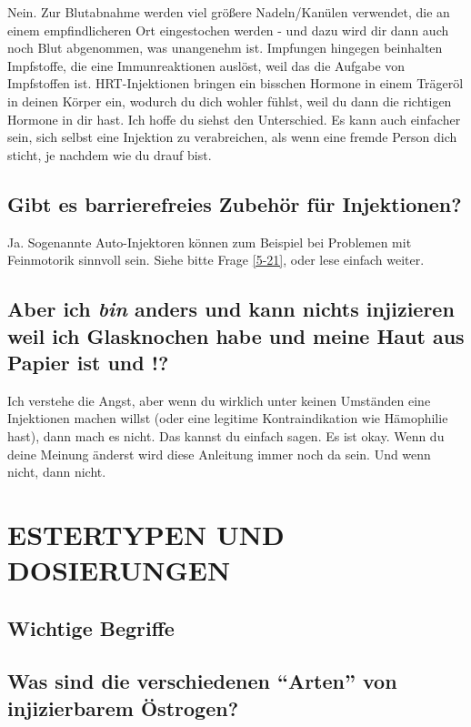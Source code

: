 \documentclass{article}
\begin{document}
Nein. Zur Blutabnahme werden viel größere Nadeln/Kanülen verwendet, die an einem empfindlicheren Ort eingestochen werden - und dazu wird dir dann auch noch Blut abgenommen, was unangenehm ist. Impfungen hingegen beinhalten Impfstoffe, die eine Immunreaktionen auslöst, weil das die Aufgabe von Impfstoffen ist. HRT-Injektionen bringen ein bisschen Hormone in einem Trägeröl in deinen Körper ein, wodurch du dich wohler fühlst, weil du dann die richtigen Hormone in dir hast. Ich hoffe du siehst den Unterschied. Es kann auch einfacher sein, sich selbst eine Injektion zu verabreichen, als wenn eine fremde Person dich sticht, je nachdem wie du drauf bist.

\subsection{Gibt es barrierefreies Zubehör für Injektionen?}

Ja. Sogenannte Auto-Injektoren können zum Beispiel bei Problemen mit Feinmotorik sinnvoll sein. Siehe bitte Frage \ref{5-21}, oder lese einfach weiter.

\subsection{Aber ich \textit{bin} anders und kann nichts injizieren weil ich Glasknochen habe und meine Haut aus Papier ist und \textemdash{}!?}

Ich verstehe die Angst, aber wenn du wirklich unter keinen Umständen eine Injektionen machen willst (oder eine legitime Kontraindikation wie Hämophilie hast), dann mach es nicht. Das kannst du einfach sagen. Es ist okay. Wenn du deine Meinung änderst wird diese Anleitung immer noch da sein. Und wenn nicht, dann nicht. 

 

\section{ESTERTYPEN UND DOSIERUNGEN}\label{td}

\subsection*{Wichtige Begriffe}

\subsection{Was sind die verschiedenen “Arten” von injizierbarem Östrogen?}
\end{document}

